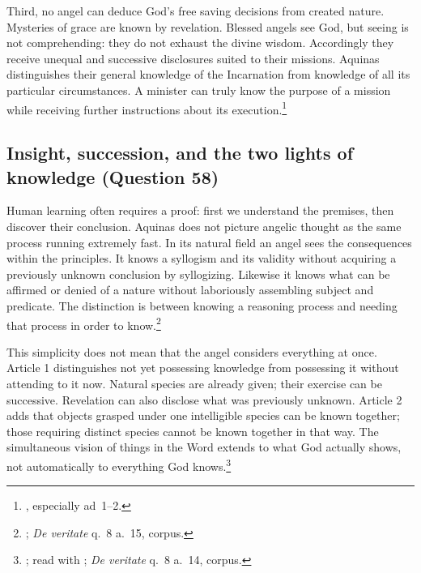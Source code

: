 Third, no angel can deduce God's free saving decisions from created nature. Mysteries of grace are known by revelation. Blessed angels see God, but seeing is not comprehending: they do not exhaust the divine wisdom. Accordingly they receive unequal and successive disclosures suited to their missions. Aquinas distinguishes their general knowledge of the Incarnation from knowledge of all its particular circumstances. A minister can truly know the purpose of a mission while receiving further instructions about its execution.\footnote{, especially ad~1--2.}


\subsection{Insight, succession, and the two lights of knowledge (Question 58)}

Human learning often requires a proof: first we understand the premises, then discover their conclusion. Aquinas does not picture angelic thought as the same process running extremely fast. In its natural field an angel sees the consequences within the principles. It knows a syllogism and its validity without acquiring a previously unknown conclusion by syllogizing. Likewise it knows what can be affirmed or denied of a nature without laboriously assembling subject and predicate. The distinction is between knowing a reasoning process and needing that process in order to know.\footnote{; \emph{De veritate} q.~8 a.~15, corpus.}

This simplicity does not mean that the angel considers everything at once. Article 1 distinguishes not yet possessing knowledge from possessing it without attending to it now. Natural species are already given; their exercise can be successive. Revelation can also disclose what was previously unknown. Article 2 adds that objects grasped under one intelligible species can be known together; those requiring distinct species cannot be known together in that way. The simultaneous vision of things in the Word extends to what God actually shows, not automatically to everything God knows.\footnote{; read with ; \emph{De veritate} q.~8 a.~14, corpus.}

